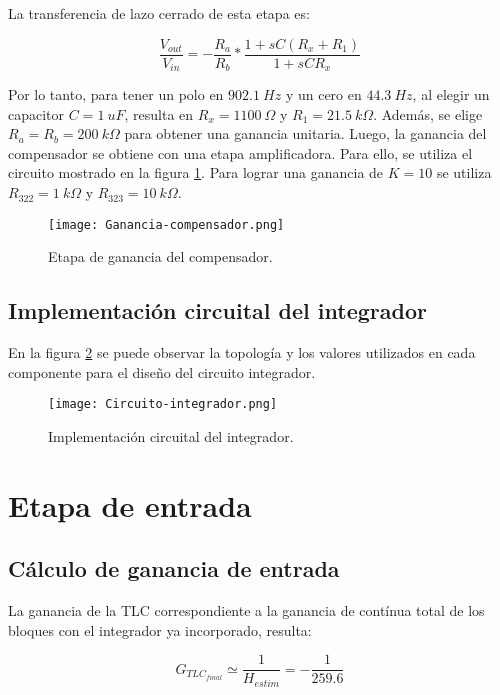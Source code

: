 \noindent La transferencia de lazo cerrado de esta etapa es:

\begin{equation} 
	\frac{V_{out}}{V_{in}}= - \frac{R_a}{R_b}*\frac{1+sC(R_x+R_1)}{1+sCR_x}
\end{equation}

\noindent Por lo tanto, para tener un polo en $902.1\:Hz$ y un cero en $44.3\:Hz$, al elegir un capacitor $C = 1\:uF$, resulta en $R_x = 1100\:\Omega$ y $R_1 = 21.5\:k\Omega$. Además, se elige $R_a = R_b = 200\:k\Omega$ para obtener una ganancia unitaria. Luego, la ganancia del compensador se obtiene con una etapa amplificadora.
Para ello, se utiliza el circuito mostrado en la figura \ref{fig:ganancia-compensador}. Para lograr una ganancia de $K=10$ se utiliza $R_{322} = 1\:k\Omega$ y $R_{323} = 10\:k\Omega$.


\begin{figure}[H]
	\centering
	\texttt{[image: Ganancia-compensador.png]}
	\caption{Etapa de ganancia del compensador.}
	\label{fig:ganancia-compensador}
\end{figure}

\subsection{Implementación circuital del integrador}

\noindent En la figura \ref{fig:circuito-integrador} se puede observar la topología y los valores utilizados en cada componente para el diseño del circuito integrador. 

\begin{figure}[H]
	\centering
	\texttt{[image: Circuito-integrador.png]}
	\caption{Implementación circuital del integrador.}
	\label{fig:circuito-integrador}
	\end{figure}
\section{Etapa de entrada}
\subsection{Cálculo de ganancia de entrada}

\noindent La ganancia de la TLC correspondiente a la ganancia de contínua total de los bloques con el integrador ya incorporado, resulta:

\begin{equation} 
	G_{TLC_{final}} \simeq \frac{1}{H_{estim}} = - \frac{1}{259.6}
\end{equation}


